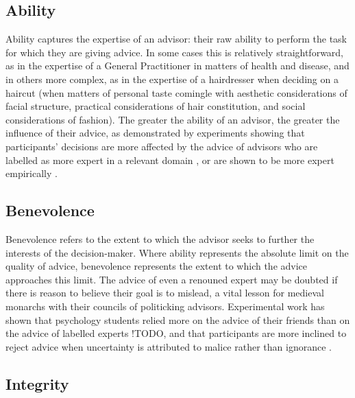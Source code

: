 \documentclass[a4paper, nobind]{templates/ociamthesis}
\begin{document}
\hypertarget{ability}{%
\subsection*{Ability}\label{ability}}

Ability captures the expertise of an advisor: their raw ability to perform the task for which they are giving advice. In some cases this is relatively straightforward, as in the expertise of a General Practitioner in matters of health and disease, and in others more complex, as in the expertise of a hairdresser when deciding on a haircut (when matters of personal taste comingle with aesthetic considerations of facial structure, practical considerations of hair constitution, and social considerations of fashion). The greater the ability of an advisor, the greater the influence of their advice, as demonstrated by experiments showing that participants' decisions are more affected by the advice of advisors who are labelled as more expert in a relevant domain \autocite{sahCheapTalkCredibility2013,schultzeInabilityIgnoreUseless2017,sniezekImprovingJudgementPrepaid2004,sniezekTrustConfidenceExpertise2001,sollJudgmentalAggregationStrategies2011}, or are shown to be more expert empirically \autocite{pescetelliUseMetacognitiveSignals2017,sahCheapTalkCredibility2013,yanivAdviceTakingDecision2000}.

\hypertarget{benevolence}{%
\subsection*{Benevolence}\label{benevolence}}

Benevolence refers to the extent to which the advisor seeks to further the interests of the decision-maker. Where ability represents the absolute limit on the quality of advice, benevolence represents the extent to which the advice approaches this limit. The advice of even a renouned expert may be doubted if there is reason to believe their goal is to mislead, a vital lesson for medieval monarchs with their councils of politicking advisors. Experimental work has shown that psychology students relied more on the advice of their friends than on the advice of labelled experts \autocite{CITATIONNEEDED}!TODO, and that participants are more inclined to reject advice when uncertainty is attributed to malice rather than ignorance \autocite{schulInfluencesDistrustTrust2015}.

\hypertarget{integrity}{%
\subsection*{Integrity}\label{integrity}}
\end{document}
